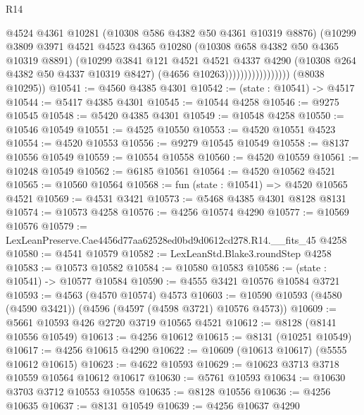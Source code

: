 \begin{lexlean}{R14}
\begin{coremodule}
                                  @4524
                                  @4361
                                  @10281
                                  (@10308 @586 @4382 @50 @4361 @10319 @8876)
                                  (@10299
                                    @3809
                                    @3971
                                    @4521
                                    @4523
                                    @4365
                                    @10280
                                    (@10308 @658 @4382 @50 @4365 @10319 @8891)
                                    (@10299
                                      @3841
                                      @121
                                      @4521
                                      @4521
                                      @4337
                                      @4290
                                      (@10308 @264 @4382 @50 @4337 @10319 @8427)
                                      (@4656 @10263)))))))))))))))))
      (@8038 @10295))
@10541 := @4560 @4385 @4301
@10542 := (state : @10541) -> @4517
@10544 := @5417 @4385 @4301
@10545 := @10544 @4258
@10546 := @9275 @10545
@10548 := @5420 @4385 @4301
@10549 := @10548 @4258
@10550 := @10546 @10549
@10551 := @4525 @10550
@10553 := @4520 @10551 @4523
@10554 := @4520 @10553
@10556 := @9279 @10545 @10549
@10558 := @8137 @10556 @10549
@10559 := @10554 @10558
@10560 := @4520 @10559
@10561 := @10248 @10549
@10562 := @6185 @10561
@10564 := @4520 @10562 @4521
@10565 := @10560 @10564
@10568 := fun (state : @10541) => @4520 @10565 @4521
@10569 := @4531 @3421
@10573 := @5468 @4385 @4301 @8128 @8131
@10574 := @10573 @4258
@10576 := @4256 @10574 @4290
@10577 := @10569 @10576
@10579 := LexLeanPreserve.Cae4456d77aa62528ed0bd9d0612cd278.R14.__fits_45 @4258
@10580 := @4541 @10579
@10582 := LexLeanStd.Blake3.roundStep @4258
@10583 := @10573 @10582
@10584 := @10580 @10583
@10586 := (state : @10541) -> @10577 @10584
@10590 := @4555 @3421 @10576 @10584 @3721
@10593 := @4563 (@4570 @10574) @4573
@10603 := @10590 @10593 (@4580 (@4590 @3421)) (@4596 (@4597 (@4598 @3721) @10576 @4573))
@10609 := @5661 @10593 @426 @2720 @3719 @10565 @4521
@10612 := @8128 (@8141 @10556 @10549)
@10613 := @4256 @10612
@10615 := @8131 (@10251 @10549)
@10617 := @4256 @10615 @4290
@10622 := @10609 (@10613 @10617) (@5555 @10612 @10615)
@10623 := @4622 @10593
@10629 := @10623 @3713 @3718 @10559 @10564 @10612 @10617
@10630 := @5761 @10593
@10634 := @10630 @3703 @3712 @10553 @10558
@10635 := @8128 @10556
@10636 := @4256 @10635
@10637 := @8131 @10549
@10639 := @4256 @10637 @4290

\end{coremodule}
\end{lexlean}
